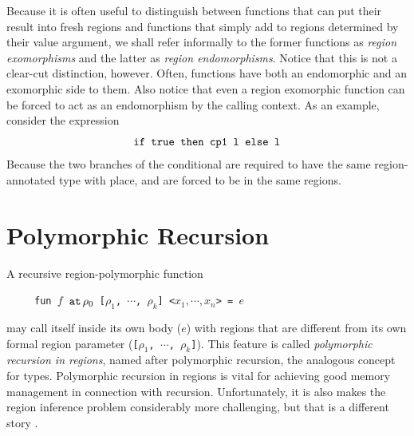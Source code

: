 \documentclass[12pt]{book}
\begin{document}
Because it is often useful to distinguish between functions that can
put their result into fresh regions and functions that simply add to
regions determined by their value argument, we shall refer informally
to the former functions as
%
{\em region exomorphisms} and the latter as
%
{\em region endomorphisms}. Notice that this is not a clear-cut
distinction, however. Often, functions have both an endomorphic and an
exomorphic side to them. Also notice that even a region exomorphic
function can be forced to act as an endomorphism by the calling
context. As an example, consider the expression
$$\hbox{\tt if true then cp1 l else l}$$
Because the two branches of the
conditional are required to have the same region-annotated type with
place,  and  are forced to be in the same
regions.

\section{Polymorphic Recursion}

\label{polyrec.sec}
A 
%
recursive region-polymorphic function
\begin{tabbing}
\ \ \ \ \ \=\tt fun $f$ $\mathbin{\hbox{\tt at}}\,\rho_0$ [$\rho_1$, $\cdots$, $\rho_k$] <$x_1,\cdots,x_n$> = $e$
\end{tabbing}
may call itself inside its own body ($e$) with regions that are different
from its own formal region parameter ({\tt [$\rho_1$, $\cdots$, $\rho_k$]}).
This feature is called {\it polymorphic recursion in regions}, named after
polymorphic recursion, the analogous concept for types.
Polymorphic recursion in regions is vital for achieving good 
memory management in connection with recursion.
Unfortunately, it is also makes  the region inference problem considerably more
challenging, but that is a different story \cite{tofbir98}.
\end{document}
